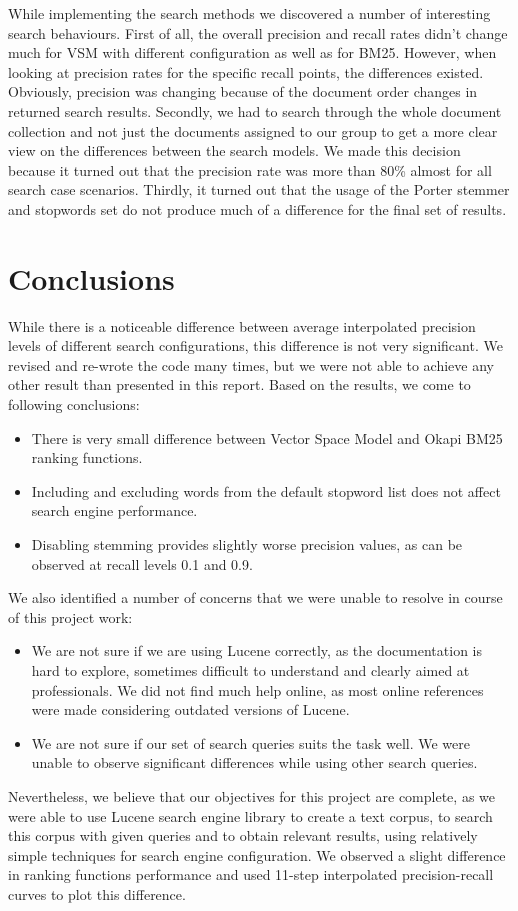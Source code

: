 \documentclass[parskip=full]{aaltoseries}
\begin{document}
While implementing the search methods we discovered a number of interesting search behaviours. First of all, the overall precision and recall rates didn't change much for VSM with different configuration as well as for BM25. However, when looking at precision rates for the specific recall points, the differences existed. Obviously, precision was changing because of the document order changes in returned search results. 
Secondly, we had to search through the whole document collection and not just the documents assigned to our group to get a more clear view on the differences between the search models. We made this decision because it turned out that the precision rate was more than 80\% almost for all search case scenarios. 
Thirdly, it turned out that the usage of the Porter stemmer and stopwords set do not produce much of a difference for the final set of results.  
\chapter{Conclusions}
While there is a noticeable difference between average interpolated precision levels of different search configurations, this difference is not very significant. We revised and re-wrote the code many times, but we were not able to achieve any other result than presented in this report. Based on the results, we come to following conclusions:
\begin{itemize}
\item There is very small difference between Vector Space Model and Okapi BM25 ranking functions.
\item Including and excluding words from the default stopword list does not affect search engine performance.
\item Disabling stemming provides slightly worse precision values, as can be observed at recall levels 0.1 and 0.9.
\end{itemize}
We also identified a number of concerns that we were unable to resolve in course of this project work:
\begin{itemize}
\item We are not sure if we are using Lucene correctly, as the documentation is hard to explore, sometimes difficult to understand and clearly aimed at professionals. We did not find much help online, as most online references were made considering outdated versions of Lucene.
\item We are not sure if our set of search queries suits the task well. We were unable to observe significant differences while using other search queries.
\end{itemize}
Nevertheless, we believe that our objectives for this project are complete, as we were able to use Lucene search engine library to create a text corpus, to search this corpus with given queries and to obtain relevant results, using relatively simple techniques for search engine configuration. We observed a slight difference in ranking functions performance and used 11-step interpolated precision-recall curves to plot this difference.
\end{document}
